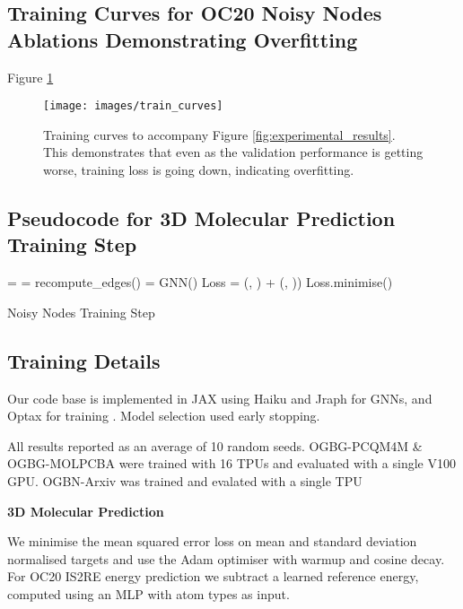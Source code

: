 \documentclass{article} \usepackage{iclr2022_conference,times}
\begin{document}
\subsection{Training Curves for OC20 Noisy Nodes Ablations Demonstrating Overfitting}\label{train_curves}

Figure \ref{fig:train_curves}

\begin{figure}
    \centering
    \texttt{[image: images/train\_curves]}
    \caption{Training curves to accompany Figure \ref{fig:experimental_results}. This demonstrates that even as the validation performance is getting worse, training loss is going down, indicating overfitting.}
    \label{fig:train_curves}
\end{figure}

\subsection{Pseudocode for 3D Molecular Prediction Training Step}

\begin{algorithm}[H]
\SetAlgoLined
 =   
 = recompute\_edges()\;
 = GNN()\;
Loss =  (, ) + (, ))\;
Loss.minimise()
\caption{Noisy Nodes Training Step}
\end{algorithm}


\subsection{Training Details}\label{mol-3d-training}

Our code base is implemented in JAX using Haiku and Jraph for GNNs, and Optax for training \citep{jax2018github, deepmind2020jax, jraph2020github, haiku2020github}. Model selection used early stopping. 

All results reported as an average of 10 random seeds. OGBG-PCQM4M \& OGBG-MOLPCBA were trained with 16 TPUs and evaluated with a single V100 GPU. OGBN-Arxiv was trained and evalated with a single TPU

\textbf{3D Molecular Prediction}

We minimise the mean squared error loss on mean and standard deviation normalised targets and use the Adam \citep{Kingma2015AdamAM} optimiser with warmup and cosine decay. For OC20 IS2RE energy prediction we subtract a learned reference energy, computed using an MLP with atom types as input.
\end{document}

